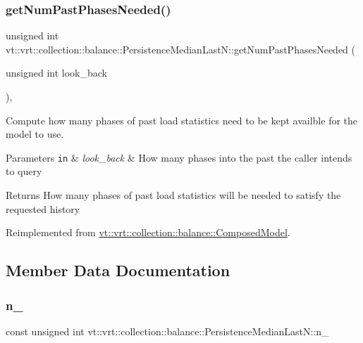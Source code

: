 \subsubsection{\texorpdfstring{get\+Num\+Past\+Phases\+Needed()}{getNumPastPhasesNeeded()}}
{\footnotesize\ttfamily unsigned int vt\+::vrt\+::collection\+::balance\+::\+Persistence\+Median\+Last\+N\+::get\+Num\+Past\+Phases\+Needed (\begin{DoxyParamCaption}\item[{unsigned int}]{look\+\_\+back }\end{DoxyParamCaption})\hspace{0.3cm}{\ttfamily [override]}, {\ttfamily [virtual]}}



Compute how many phases of past load statistics need to be kept availble for the model to use. 


\begin{DoxyParams}[1]{Parameters}
\mbox{\tt in}  & {\em look\+\_\+back} & How many phases into the past the caller intends to query\\
\hline
\end{DoxyParams}
\begin{DoxyReturn}{Returns}
How many phases of past load statistics will be needed to satisfy the requested history 
\end{DoxyReturn}


Reimplemented from \hyperlink{classvt_1_1vrt_1_1collection_1_1balance_1_1_composed_model_abf2a02ff624e66c7076bfe3dce961981}{vt\+::vrt\+::collection\+::balance\+::\+Composed\+Model}.



\subsection{Member Data Documentation}
\mbox{\label{structvt_1_1vrt_1_1collection_1_1balance_1_1_persistence_median_last_n_aa800c86e610ba7b4ff0ddf0c91210136}} 
\subsubsection{\texorpdfstring{n\+\_\+}{n\_}}
{\footnotesize\ttfamily const unsigned int vt\+::vrt\+::collection\+::balance\+::\+Persistence\+Median\+Last\+N\+::n\+\_\+\hspace{0.3cm}{\ttfamily [private]}}



